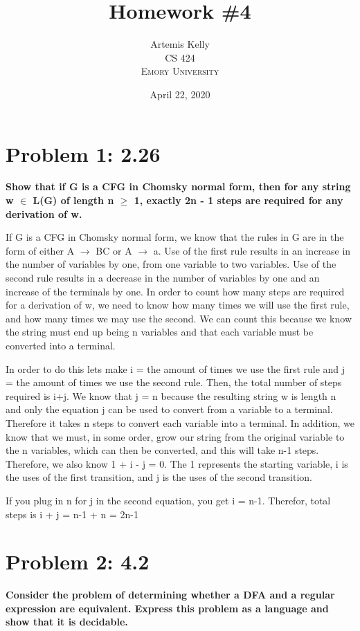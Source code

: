 \documentclass[12pt]{article}
\title{Homework \#4} %
\author{Artemis Kelly\\ %
CS 424 \\ %
\textsc{Emory University}
}
\date{April 22, 2020} %
\begin{document}
\setlength{\droptitle}{-5em}    
\maketitle


\section*{Problem 1: 2.26}
{\bfseries Show that if G is a CFG in Chomsky normal form, then for any string w $\in$ L(G) of length n $\geq$ 1, exactly 2n - 1 steps are required for any derivation of w. }

If G is a CFG in Chomsky normal form, we know that the rules in G are in the form of either A $\xrightarrow{}$ BC or A $\xrightarrow{}$ a. Use of the first rule results in an increase in the number of variables by one, from one variable to two variables. Use of the second rule results in a decrease in the number of variables by one and an increase of the terminals by one. In order to count how many steps are required for a derivation of w, we need to know how many times we will use the first rule, and how many times we may use the second. We can count this because we know the string must end up being n variables and that each variable must be converted into a terminal.

In order to do this lets make i = the amount of times we use the first rule and j = the amount of times we use the second rule. Then, the total number of steps required is i+j. We know that j = n because the resulting string w is length n and only the equation j can be used to convert from a variable to a terminal. Therefore it takes n steps to convert each variable into a terminal. In addition, we know that we must, in some order, grow our string from the original variable to the n variables, which can then be converted, and this will take n-1 steps. Therefore, we also know 1 + i - j = 0. The 1 represents the starting variable, i is the uses of the first transition, and j is the uses of the second transition.

If you plug in n for j in the second equation, you get i = n-1. Therefor, total steps is i + j = n-1 + n = 2n-1



\section*{Problem 2: 4.2}
{\bfseries Consider the problem of determining whether a DFA and a regular expression are equivalent. Express this problem as a language and show that it is decidable. }
\end{document}
